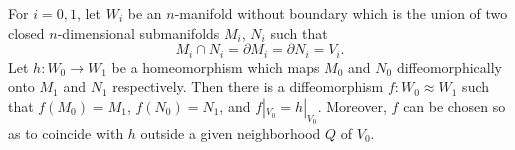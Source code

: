 For $i = 0, 1$, let $W_i$ be an $n$-manifold without boundary which is the union of two closed $n$-dimensional submanifolds $M_i$, $N_i$ such that
$$M_i \cap N_i = \partial M_i = \partial N_i = V_i.$$
Let $h: W_0 \to W_1$ be a homeomorphism which maps $M_0$ and $N_0$ diffeomorphically onto $M_1$ and $N_1$ respectively. Then there is a diffeomorphism $f: W_0 \approx W_1$ such that $f(M_0) = M_1$, $f(N_0) = N_1$, and $f|_{V_0} = h|_{V_0}$. Moreover, $f$ can be chosen so as to coincide with $h$ outside a given neighborhood $Q$ of $V_0$.
